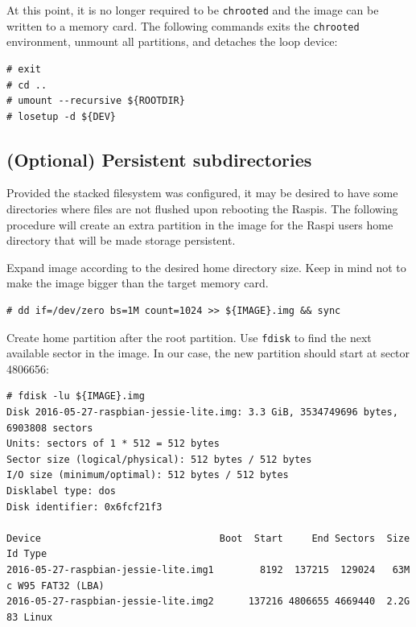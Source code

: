 At this point, it is no longer required to be \texttt{chrooted} and the image
can be written to a memory card. The following commands exits the \texttt{chrooted}
environment, unmount all partitions, and detaches the loop device:

\begin{lstlisting}[]
# exit
# cd ..
# umount --recursive ${ROOTDIR}
# losetup -d ${DEV}
\end{lstlisting}
\FloatBarrier
\vspace{-5mm}

\subsection{(Optional) Persistent subdirectories}

Provided the stacked filesystem was configured, it may be desired to have
some directories where files are not flushed upon rebooting the \ac{Raspi}s.
The following procedure will create an extra partition in the image for
the \ac{Raspi} users home directory that will be made storage persistent.

Expand image according to the desired home directory size. Keep in mind not
to make the image bigger than the target memory card.
\begin{lstlisting}[]
# dd if=/dev/zero bs=1M count=1024 >> ${IMAGE}.img && sync
\end{lstlisting}
\FloatBarrier
\vspace{-5mm}

Create home partition after the root partition. Use \texttt{fdisk} to
find the next available sector in the image. In our case, the new
partition should start at sector 4806656:
\begin{lstlisting}[]
# fdisk -lu ${IMAGE}.img
Disk 2016-05-27-raspbian-jessie-lite.img: 3.3 GiB, 3534749696 bytes, 6903808 sectors
Units: sectors of 1 * 512 = 512 bytes
Sector size (logical/physical): 512 bytes / 512 bytes
I/O size (minimum/optimal): 512 bytes / 512 bytes
Disklabel type: dos
Disk identifier: 0x6fcf21f3

Device                               Boot  Start     End Sectors  Size Id Type
2016-05-27-raspbian-jessie-lite.img1        8192  137215  129024   63M  c W95 FAT32 (LBA)
2016-05-27-raspbian-jessie-lite.img2      137216 4806655 4669440  2.2G 83 Linux
\end{lstlisting}
\FloatBarrier
\vspace{-5mm}


